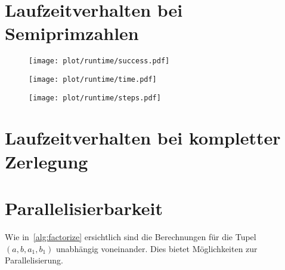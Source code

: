\section{Laufzeitverhalten bei Semiprimzahlen}
\begin{figure}[ht]
		\centering
		\texttt{[image: plot/runtime/success.pdf]}
\end{figure}
\begin{figure}[ht]
		\centering
		\texttt{[image: plot/runtime/time.pdf]}
\end{figure}
\begin{figure}[ht]
		\centering
		\texttt{[image: plot/runtime/steps.pdf]}
\end{figure}

\section{Laufzeitverhalten bei kompletter Zerlegung}

\section{Parallelisierbarkeit}
Wie in~\ref{alg:factorize} ersichtlich sind die Berechnungen für die Tupel $\left(a, b, a_1, b_1\right)$ unabhängig voneinander. Dies bietet Möglichkeiten zur Parallelisierung.
